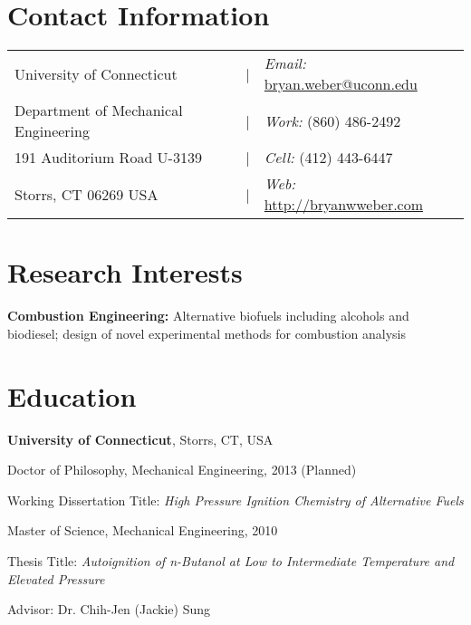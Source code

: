 \documentclass[margin,line]{res}
\newenvironment{list1}{
  \begin{list}{\ding{113}}{%
      \setlength{\itemsep}{0in}
      \setlength{\parsep}{0in} \setlength{\parskip}{0in}
      \setlength{\topsep}{0in} \setlength{\partopsep}{0in} 
      \setlength{\leftmargin}{0.17in}}}{\end{list}}
\begin{document}

\begin{resume}
\section{\sc Contact Information}
\vspace{.05in}
\begin{tabular}{@{}p{2.5in}p{0.1in}p{2in}}
University of Connecticut             &|& {\it Email:}  \href{mailto:bryan.weber@uconn.edu}{bryan.weber@uconn.edu}\\
Department of Mechanical Engineering  &|& {\it Work:} (860) 486-2492 \\         
191 Auditorium Road U-3139            &|& {\it Cell:} (412) 443-6447 \\            
Storrs, CT 06269 USA                  &|& {\it Web:} \url{http://bryanwweber.com} \\     
\end{tabular}


\section{\sc Research Interests}
{\bf Combustion Engineering:} Alternative biofuels including alcohols and biodiesel; design of novel experimental methods for combustion analysis

\section{\sc Education}
{\bf University of Connecticut}, Storrs, CT, USA
\begin{list1}
\item[] Doctor of Philosophy, Mechanical Engineering, 2013 (Planned)
\item[] Working Dissertation Title: \emph{High Pressure Ignition Chemistry of Alternative Fuels}
\end{list1}
\vspace*{0.1in}
\begin{list1}
\item[] Master of Science, Mechanical Engineering, 2010
\item[] Thesis Title: \emph{Autoignition of n-Butanol at Low to Intermediate Temperature and Elevated Pressure}
\end{list1}
\vspace*{0.1in}
\begin{list1}
\item[] Advisor: Dr. Chih-Jen (Jackie) Sung
\end{list1}


\end{resume}
\end{document}
